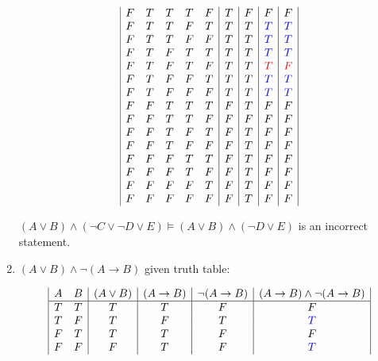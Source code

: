 \documentclass{article}
\begin{document}
\begin{enumerate}
\begin{center}
\begin{displaymath}
{\begin{array}{|c c c c c|c|c|c|c|c|}
                F & T & T & T & F & T & F & F & F\\
                F & T & T & F & T & T & T & {\textcolor{blue}{T}} & {\textcolor{blue}{T}}\\
                F & T & T & F & F & T & T & {\textcolor{blue}{T}} & {\textcolor{blue}{T}}\\
                F & T & F & T & T & T & T & {\textcolor{blue}{T}} & {\textcolor{blue}{T}}\\
                F & T & F & T & F & T & T & {\textcolor{red}{T}} & \textcolor{red}{F}\\
                F & T & F & F & T & T & T & {\textcolor{blue}{T}} & {\textcolor{blue}{T}}\\
                F & T & F & F & F & T & T & {\textcolor{blue}{T}} & {\textcolor{blue}{T}}\\
                F & F & T & T & T & F & T & F & F\\
                F & F & T & T & F & F & F & F & F\\
                F & F & T & F & T & F & T & F & F\\
                F & F & T & F & F & F & T & F & F\\
                F & F & F & T & T & F & T & F & F\\
                F & F & F & T & F & F & T & F & F\\
                F & F & F & F & T & F & T & F & F\\
                F & F & F & F & F & F & T & F & F\\
                \end{array}}
            \end{displaymath}
        \end{center}
    \textit{$(A \lor B) \land (\neg C \lor \neg D \lor E) \vDash (A \lor B) \land (\neg D \lor E)$} is an incorrect statement.\\



    \item \textit{$(A \lor B) \land \neg(A \rightarrow B)$} given truth table: 
    
        \begin{center}
        \begin{displaymath}
            \begin{array}{|c c|c|c|c|c|}
                A & B & (A \lor B) & (A \rightarrow B) & \neg(A \rightarrow B) & (A \rightarrow B) \land \neg(A \rightarrow B)  \\
                \hline
                T & T & T & T & F & F\\
                T & F & T & F & T & {\textcolor{blue}{T}}\\
                F & T & T & T & F & F\\
                F & F & F & T & F & {\textcolor{blue}{T}}\\
            \end{array}
        \end{displaymath}
        \end{center}
        

\end{enumerate}
\end{document}
